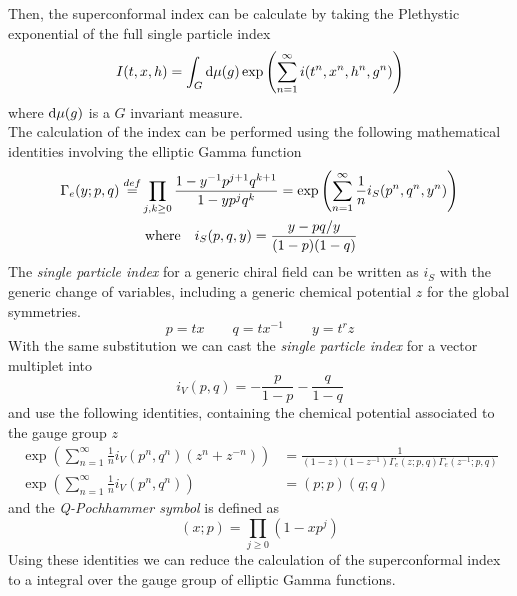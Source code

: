 Then, the superconformal index can be calculate by taking the Plethystic exponential \cite{Feng:2007ur} of the full single particle index
\begin{equation}
  I(t,x,h) = \int_{G} \hbox{d} \mu(g) \exp{ \left(  \sum_{n=1}^{\infty}i(t^n,x^n,h^n,g^n) \right)}
  \end{equation}  
where $\hbox{d} \mu(g)$ is a $G$ invariant measure.\\
The calculation of the index can be performed using the following mathematical identities involving the elliptic Gamma function
\begin{align}
\Gamma_e ( y; p, q) \overset{def}{=} & \prod_{j,k \geq 0} \frac{1 - y^{-1}p^{j+1}q^{k+1}}{1 - y p^j q^k} = \exp \left(  
\sum_{n=1}^{\infty} \frac{1}{n} i_S(p^n,q^n,y^n)
\right)\\
& \; \hbox{where} \quad i_S(p,q,y) = \frac{y - pq/y}{(1-p)(1-q)}
\end{align}
The \emph{single particle index} for a generic chiral field can be written as $i_S$ with the generic change of variables, including a generic chemical potential $z$ for the global symmetries. 
\begin{equation}
p = tx \qquad q = t x^{-1} \qquad y = t^r z
\end{equation}
With the same substitution we can cast the \emph{single particle index} for a vector multiplet into
\begin{equation}
i_V(p,q) = - \frac{p}{1-p} - \frac{q}{1-q}
\end{equation}
and use the following identities, containing the chemical potential associated to the gauge group $z$
\begin{align}
\exp \left(  
\sum_{n=1}^{\infty} \frac{1}{n} i_V(p^n,q^n) ( z^n + z^{-n}) \right) & = \frac{1}{(1-z)(1-z^{-1}) \Gamma_e(z;p,q) \Gamma_e(z^{-1};p,q)}
\\
\exp \left(
\sum_{n=1}^{\infty} \frac{1}{n} i_V(p^n,q^n) \right) & = (p;p) (q;q)
\end{align}
and the \emph{Q-Pochhammer symbol} is defined as
\begin{equation}
(x;p) = \prod_{j \geq 0} ( 1- x p^j)
\end{equation}
Using these identities we can reduce the calculation of the superconformal index to a integral over the gauge group of elliptic Gamma functions.\\





